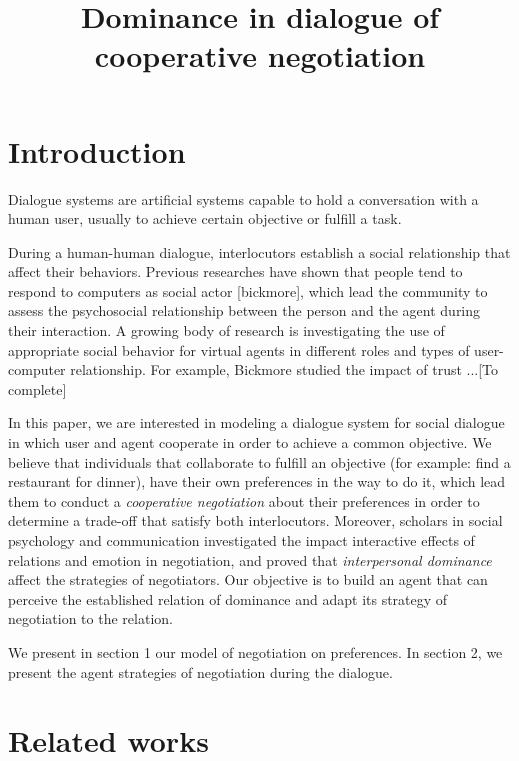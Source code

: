 \documentclass{llncs}
\begin{document}
			\title{\vskip -10pt Dominance in dialogue of cooperative negotiation}
			\maketitle
		\section{Introduction}
		Dialogue systems are artificial systems capable to hold a conversation with a human user, usually to achieve certain objective or fulfill a task.
		
		During a human-human dialogue, interlocutors establish a social relationship that affect their behaviors. Previous researches have shown that people tend to respond to computers as social actor [bickmore], which lead the community to assess the psychosocial relationship between the person and the agent during their interaction. 
		A growing body of research is investigating the use of appropriate social behavior for virtual agents in different roles and types of user-computer relationship.
		For example, Bickmore studied the impact of trust ...[To complete]
		
		
		In this paper, we are interested in modeling a dialogue system for social dialogue in which user and agent cooperate in order to achieve a common objective.  We believe that individuals that collaborate to fulfill an objective (for example: find a restaurant for dinner), have their own preferences in the way to do it, which lead them to conduct a \emph{cooperative negotiation} about their preferences in order to determine a trade-off that satisfy both interlocutors. Moreover, scholars in social psychology and communication investigated the impact interactive effects of relations and emotion in negotiation, and proved that  \emph{interpersonal dominance} affect the strategies of negotiators. Our objective is to build an agent that can perceive the established relation of dominance and adapt its strategy of negotiation to the relation. 
		
		We present in section 1 our model of negotiation on preferences. In section 2, we present the agent strategies of negotiation during the dialogue.
		
		\section{Related works}
		
\end{document}
